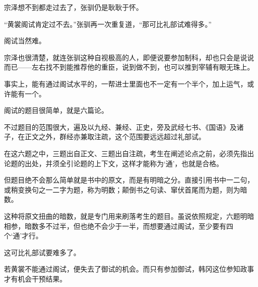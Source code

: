 宗泽想不到都走过去了，张驯仍是耿耿于怀。

“黄裳阁试肯定过不去。”张驯再一次重复道，“那可比礼部试难得多。”

阁试当然难。

宗泽也很清楚，就连张驯这种自视极高的人，即便说要参加制科，却也只会是说说而已——左右找不到能推荐他的重臣，说到做不到，也可以推到宰辅有眼无珠上。

事实上，能有通过阁试水平的，一帮进士里面也不一定有一个半个，加上运气，或许能有一个。

阁试的题目很简单，就是六篇论。

不过题目的范围很大，遍及以九经、兼经、正史，旁及武经七书、《国语》及诸子，在正文之外，群经亦兼取注疏，这个范围要远远超过礼部试。

在这六题之中，三题出自正文、三题出自注疏，考生在阐述论点之前，必须先指出论题的出处，并须全引论题的上下文，这样才能称为‘通’，也就是合格。

但题目绝不会那么简单就是书中的原文，而是有明暗之分。直接引用书中一二句，或稍变换句之一二字为题，称为明数；颠倒书之句读、窜伏首尾而为题，则为暗数。

这种将原文扭曲的暗数，就是专门用来刷落考生的题目。虽说依照规定，六题明暗相参，暗数多不过半，但也绝不会少于一半，而想要通过阁试，至少要有四个‘通’才行。

这可比礼部试要难多了。

若黄裳不能通过阁试，便失去了御试的机会。而只有参加御试，韩冈这位参知政事才有机会干预结果。

